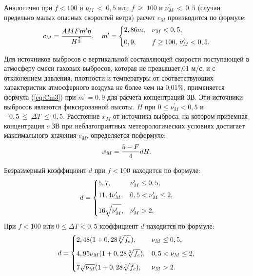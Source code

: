 \documentclass[14pt, a4paper]{extreport}
\begin{document}
	Аналогично при $f < 100$ и $\nu_M~<~0,5$ или $f~\geq~100$ и $\nu_M^\prime~<~0,5$ (случаи предельно малых опасных скоростей ветра) расчет $c_M$ производится по формуле:
	\begin{equation}
		c_M = \frac{AMFm^\prime \eta}{H^{\frac{7}{3}}},\quad m^\prime = 
		\begin{dcases}
			2,86 m, & \nu_M < 0,5, \vspace*{0.1cm} \\
			0,9, & f \geq 100 \textup{, } \nu_M^\prime < 0,5.
		\end{dcases}
		\label{eq:Cm3}
	\end{equation}
	
	Для источников выбросов с вертикальной составляющей скорости поступающей в атмосферу смеси гаховых выбросов, которая не превышает,01 м/с, и с отклонением давления, плотности и температуры от соответствующих характеристик атмосферного воздуха не более чем на 0,01\%, применяется формула (\ref{eq:Cm3}) при $m^\prime = 0,9$ для расчета концентраций ЗВ. Эти источники выбросов являются фиксированной высоты. $H$ при $0 \leq \nu_M^\prime < 0,5$ и $-0,5~\leq~\Delta T~\leq~0,5$. Расстояние $x_M$ от источника выброса, на котором приземная концентрация $c$ ЗВ при неблагоприятных метеорологических условиях достигает максимального значения $c_M$, определяется по\linebreak формуле:
	\begin{equation*}
		x_M = \frac{5 - F}{4} d H.
		\label{eq:Xm}
		\vspace*{-0.2cm}
	\end{equation*}
	
	Безразмерный коэффициент $d$ при $f<100$ находится по формуле:
	\begin{equation*}
		d = 
		\begin{dcases}
			5,7, &  \nu_M^\prime \leq 0,5,  \vspace*{0.1cm} \\
			11,4 \nu_M^\prime, &  0,5 < \nu_M^\prime \leq 2,  \vspace*{0.1cm} \\
			16 \sqrt{\nu_M^\prime}, & \nu_M^\prime > 2.
		\end{dcases}
		\label{eq:d6}
	\end{equation*}
	При $f<100$ или $0 \leq \Delta T < 0,5$ коэффициент $d$ находится по формуле:
	\begin{equation*}
		d = 
		\begin{dcases}
			2,48(1 + 0,28\sqrt[3]{f_e}), & \nu_M \leq 0,5,  \vspace*{0.1cm} \\
			4,95 \nu_M (1 + 0,28\sqrt[3]{f_e}), &  0,5 < \nu_M \leq 2, \vspace*{0.1cm} \\
			7 \sqrt{\nu_M}(1 + 0,28\sqrt[3]{f_e}), &  \nu_M > 2. 
		\end{dcases}
		\label{eq:d3}
	\end{equation*}
	
\end{document}
